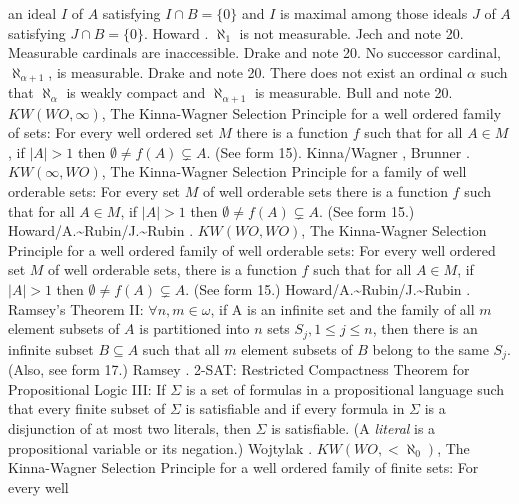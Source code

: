 an ideal $I$ of $A$ satisfying $I\cap B=\{0\}$ and $I$ is maximal among
those ideals $J$ of $A$ satisfying $J \cap B = \{0\}$.  \ac{Howard}
\cite{1973}.
\medskip
{} $\aleph_1$ is not measurable.
\ac{Jech} \cite{1968a} and note 20.
\medskip
{} Measurable cardinals are inaccessible. \ac{Drake}
\cite{1974} and note 20.
\medskip
{} No successor cardinal, $\aleph_{\alpha+1}$, is
measurable. \ac{Drake} \cite{1974} and note 20.
\medskip
{} There does not exist an ordinal
$\alpha$ such that $\aleph_{\alpha}$ is weakly compact and
$\aleph_{\alpha+1}$ is measurable. \ac{Bull} \cite{1978} and note 20.
\medskip
{} $KW(WO,\infty)$, The Kinna-Wagner Selection
Principle for a well ordered family of sets: For every  well ordered set
$M$ there is a function $f$ such that for all $A\in M$, if $|A|>1$ then
$\emptyset\neq f(A)\subsetneq A$.  (See form 15).
\ac{Kinna/Wagner} \cite{1955}, \ac{Brunner} \cite{1982a}.
\medskip
{} $KW(\infty,WO)$, The Kinna-Wagner Selection
Principle for a family of well orderable sets: For every set $M$ of
well orderable sets there is a function $f$ such that for all $A\in M$,
if $|A| > 1$ then $\emptyset\neq f(A)\subsetneq A$.  (See form 15.)
\ac{Howard/A.~Rubin/J.~Rubin}  \cite{1997}.
\medskip
{} $KW(WO,WO)$, The Kinna-Wagner Selection Principle
for a well ordered family of well orderable sets: For every well ordered
set $M$ of well orderable sets, there is a function $f$ such that for all
$A\in M$, if $|A| > 1$ then $\emptyset\neq f(A)\subsetneq A$.
(See form 15.) \ac{Howard/A.~Rubin/J.~Rubin} \cite{1997}.
\medskip
{} Ramsey's Theorem II: $\forall n,m\in\omega$, if
A is an infinite set and the family of all $m$ element subsets of $A$ is
partitioned into $n$ sets $S_{j}, 1\le j\le n$, then there is an infinite
subset $B\subseteq A$ such that all $m$ element subsets of $B$ belong to
the same $S_{j}$. (Also, see form 17.)  \ac{Ramsey} \cite{1929}.
\medskip
{}  2-SAT:  Restricted Compactness Theorem for
Propositional Logic III:   If $\Sigma$ is a set of formulas in a
propositional language such that every finite subset of $\Sigma$
is satisfiable and if every formula in $\Sigma$ is a disjunction
of at most two literals, then $\Sigma$ is satisfiable.
(A {\it literal} is a propositional variable or its negation.)
\ac{Wojtylak} \cite{1995}.
\medskip
{} $KW(WO,<\aleph_0)$,  The Kinna-Wagner Selection
Principle for a well ordered family of finite sets: For every well
